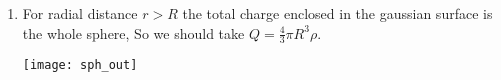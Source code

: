 \documentclass[class=article, crop=false, 12pt]{standalone}
\begin{document}
\begin{example}
\begin{enumerate}
        \item For radial distance $r > R$
        the total charge enclosed in the gaussian surface is the whole sphere,
        So we should take $Q=\frac{4}{3}\pi R^3\rho$.
        \begin{center}
            \begin{minipage}{0.4\linewidth}
            \end{minipage}
            \hspace{0.05\textwidth}
            \begin{minipage}{0.15\linewidth}
                \centering
                \texttt{[image: sph\_out]}
            \end{minipage}
        \end{center}

    \end{enumerate}
    
\end{example}
\end{document}
